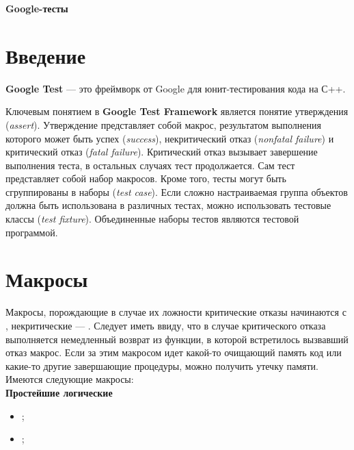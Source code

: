 \documentclass[a4paper, 11pt]{article}
\newcommand{\assertiontype}[1]{{\large \bfseries #1}}
\begin{document}
	\begin{center}
		{\LARGE \bfseries Google-тесты}
	\end{center}

	\tableofcontents

	\newpage
	
	\section{Введение}
	
	{\bfseries Google Test} — это фреймворк от Google для юнит-тестирования кода на С++.
	
	Ключевым понятием в {\bfseries Google Test Framework} является понятие утверждения ({\itshape assert}). Утверждение представляет собой макрос, результатом выполнения которого может быть успех ({\itshape success}), некритический отказ ({\itshape nonfatal failure}) и критический отказ ({\itshape fatal failure}). Критический отказ вызывает завершение выполнения теста, в остальных случаях тест продолжается. Сам тест представляет собой набор макросов. Кроме того, тесты могут быть сгруппированы в наборы ({\itshape test case}). Если сложно настраиваемая группа объектов должна быть использована в различных тестах, можно использовать тестовые классы ({\itshape test fixture}). Объединенные наборы тестов являются тестовой программой.\\
	
	\section{Макросы}
	
	Макросы, порождающие в случае их ложности критические отказы начинаются с , некритические — . Следует иметь ввиду, что в случае критического отказа выполняется немедленный возврат из функции, в которой встретилось вызвавший отказ макрос. Если за этим макросом идет какой-то очищающий память код или какие-то другие завершающие процедуры, можно получить утечку памяти.\\
	
	Имеются следующие макросы:\\
	
	\assertiontype{Простейшие логические}
	
	\begin{itemize}
		\item {};
		\item {};
	\end{itemize}
\end{document}
